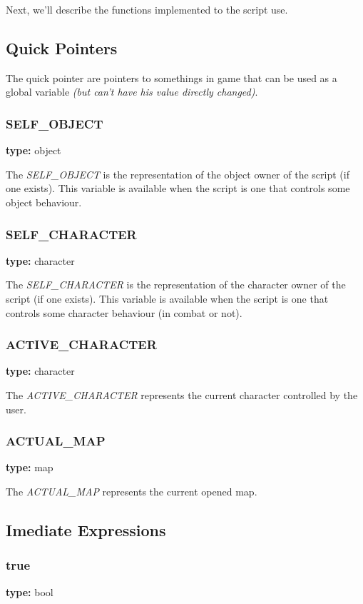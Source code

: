 \documentclass[ letterpaper,12pt]{article}
\begin{document}
Next, we'll describe the functions implemented to the script use.

\subsection{Quick Pointers}

The quick pointer are pointers to somethings in game that can be used as a
global variable {\it (but can't have his value directly changed)}.

\subsubsection{SELF\_OBJECT}
{\bf type:} object

The {\it SELF\_OBJECT} is the representation of the object owner of the script
(if one exists). This variable is available when the script is one that
controls some object behaviour.

\subsubsection{SELF\_CHARACTER}
{\bf type:} character

The {\it SELF\_CHARACTER} is the representation of the character owner of the script
(if one exists). This variable is available when the script is one that
controls some character behaviour (in combat or not).

\subsubsection{ACTIVE\_CHARACTER}
{\bf type:} character

The {\it ACTIVE\_CHARACTER} represents the current character controlled by the
user.

\subsubsection{ACTUAL\_MAP}
{\bf type:} map

The {\it ACTUAL\_MAP} represents the current opened map.


\subsection{Imediate Expressions}

\subsubsection{true}
{\bf type:} bool
\end{document}
